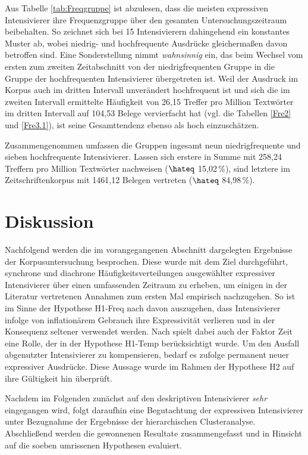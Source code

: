 Aus Tabelle \ref{tab:Freqgruppe} ist abzulesen, dass die meisten expressiven Intensivierer ihre Frequenzgruppe über den gesamten Untersuchungszeitraum beibehalten. So zeichnet sich bei 15 Intensivierern dahingehend ein konstantes Muster ab, wobei niedrig- und hochfrequente Ausdrücke gleichermaßen davon betroffen sind. Eine Sonderstellung nimmt \textit{wahnsinnig} ein, das beim Wechsel vom ersten zum zweiten Zeitabschnitt von der niedrigfrequenten Gruppe in die Gruppe der hochfrequenten Intensivierer übergetreten ist. Weil der Ausdruck im Korpus auch im dritten Intervall unverändert hochfrequent ist und sich die im zweiten Intervall ermittelte Häufigkeit von 26,15 Treffer pro Million Textwörter im dritten Intervall auf 104,53 Belege vervierfacht hat (vgl. die Tabellen \ref{Fre2} und \ref{Fre3.1}), ist seine Gesamttendenz ebenso als hoch einzuschätzen.

Zusammengenommen umfassen die Gruppen ingesamt neun niedrigfrequente und sieben hochfrequente Intensivierer. Lassen sich erstere in Summe mit 258,24 Treffern pro Million Textwörter nachweisen ($\hateq$ 15,02\,\%), sind letztere im Zeitschriftenkorpus mit 1461,12 Belegen vertreten ($\hateq$ 84,98\,\%).

\section{Diskussion} 		\label{DisKor}
\largerpage
Nachfolgend werden die im vorangegangenen Abschnitt dargelegten Ergebnisse der Korpusuntersuchung besprochen. Diese wurde mit dem Ziel durchgeführt, synchrone und diachrone Häufigkeitsverteilungen ausgewählter expressiver Intensivierer über einen umfassenden Zeitraum zu erheben, um einigen in der Literatur vertretenen Annahmen zum ersten Mal empirisch nachzugehen. So ist im Sinne der Hypothese H1-Freq nach \citet[2]{Hauschild.1899} davon auszugehen, dass Intensivierer infolge von inflationärem Gebrauch ihre Expressivität verlieren und in der Konsequenz seltener verwendet werden. Nach \citet[59]{Tobler.1868} spielt dabei auch der Faktor Zeit eine Rolle, der in der Hypothese H1-Temp berücksichtigt wurde. Um den Ausfall abgenutzter Intensivierer zu kompensieren, bedarf es \citet[274]{Baumgarten.1908} zufolge permanent neuer expressiver Ausdrücke. Diese Aussage wurde im Rahmen der Hypothese H2 auf ihre Gültigkeit hin überprüft.

Nachdem im Folgenden zunächst auf den deskriptiven Intensivierer \textit{sehr} eingegangen wird, folgt daraufhin eine Begutachtung der expressiven Intensivierer unter Bezugnahme der Ergebnisse der hierarchischen Clusteranalyse. Abschließend werden die gewonnenen Resultate zusammengefasst und in Hinsicht auf die soeben umrissenen Hypothesen evaluiert.

